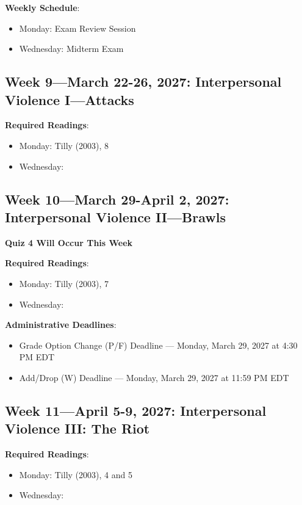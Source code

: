 \documentclass[12pt]{article}
\begin{document}
\textbf{Weekly Schedule}:
\begin{itemize}
    \item Monday: Exam Review Session
    \item Wednesday: Midterm Exam
\end{itemize}

\subsection*{Week 9---March 22-26, 2027: Interpersonal Violence I---Attacks}

\textbf{Required Readings}:
\begin{itemize}
    \item Monday: Tilly (2003), 8
    \item Wednesday: 
\end{itemize}

\subsection*{Week 10---March 29-April 2, 2027: Interpersonal Violence II---Brawls}
\textbf{Quiz 4 Will Occur This Week}

\textbf{Required Readings}:
\begin{itemize}
    \item Monday: Tilly (2003), 7
    \item Wednesday: 
\end{itemize}

\textbf{Administrative Deadlines}:
\begin{itemize}
    \item Grade Option Change (P/F) Deadline --- Monday, March 29, 2027 at 4:30 PM EDT
    \item Add/Drop (W) Deadline --- Monday, March 29, 2027 at 11:59 PM EDT
\end{itemize}

\subsection*{Week 11---April 5-9, 2027: Interpersonal Violence III: The Riot}

\textbf{Required Readings}:
\begin{itemize}
    \item Monday: Tilly (2003), 4 and 5
    \item Wednesday: 
\end{itemize}
\end{document}
